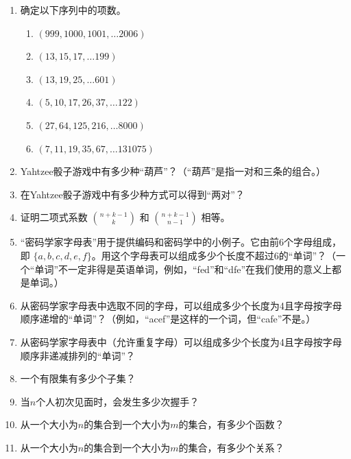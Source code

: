 \begin{enumerate}
  \item 确定以下序列中的项数。
  \begin{enumerate}
    \item \wbitemsep $(999, 1000, 1001, \ldots  2006)$
    \item \wbitemsep $(13, 15, 17, \ldots 199)$
    \item \wbitemsep $(13, 19, 25, \ldots 601)$
    \item \wbitemsep $(5, 10, 17, 26, 37, \ldots 122)$
    \item \wbitemsep $(27, 64, 125, 216, \ldots 8000)$
    \item \wbitemsep $(7, 11, 19, 35, 67, \ldots 131075)$
    \end{enumerate}
  
  \workbookpagebreak
  
  \item Yahtzee骰子游戏中有多少种“葫芦”？（“葫芦”是指一对和三条的组合。）
  
  \wbvfill
  
  \item 在Yahtzee骰子游戏中有多少种方式可以得到“两对”？
  \wbvfill
  
  \item 证明二项式系数 $\displaystyle \binom{n+k-1}{k}$ 和 $\displaystyle \binom{n+k-1}{n-1}$ 相等。
  \wbvfill
  
  \workbookpagebreak
  
  \item “密码学家字母表”用于提供编码和密码学中的小例子。它由前6个字母组成，即 $\{a, b, c, d, e, f\}$。用这个字母表可以组成多少个长度不超过6的“单词”？（一个“单词”不一定非得是英语单词，例如，“fed”和“dfe”在我们使用的意义上都是单词。）
  
  \wbvfill
  
  \item 从密码学家字母表中选取不同的字母，可以组成多少个长度为4且字母按字母顺序递增的“单词”？（例如，“acef”是这样的一个词，但“cafe”不是。）
  
  \wbvfill
  
  \item 从密码学家字母表中（允许重复字母）可以组成多少个长度为4且字母按字母顺序非递减排列的“单词”？
  \wbvfill
  
  \workbookpagebreak
  
  \item 一个有限集有多少个子集？
  
  \wbvfill
  
  \item 当$n$个人初次见面时，会发生多少次握手？
  \wbvfill
  
  \item 从一个大小为$n$的集合到一个大小为$m$的集合，有多少个函数？
  \wbvfill
  
  \item 从一个大小为$n$的集合到一个大小为$m$的集合，有多少个关系？
  \wbvfill
  
  \workbookpagebreak
  
  \end{enumerate}
  
